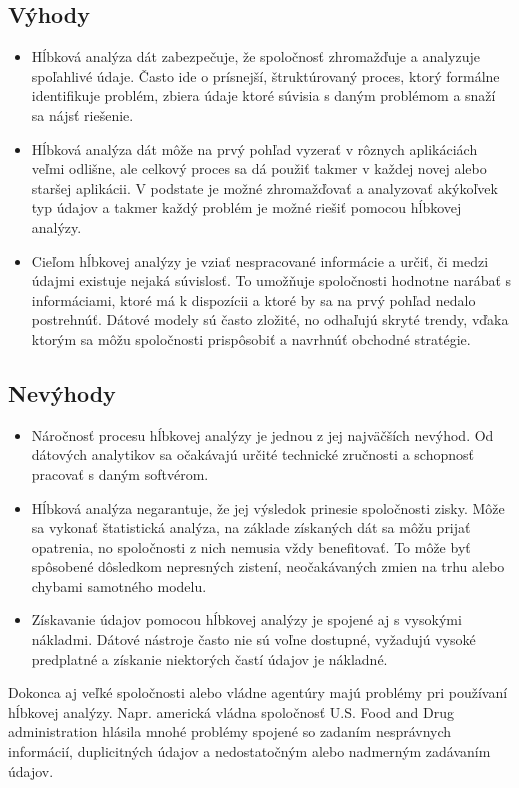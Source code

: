 \documentclass[10pt,twoside,slovak,a4paper]{article}
\begin{document}
\subsection{Výhody}
\begin{itemize}
\item Hĺbková analýza dát zabezpečuje, že spoločnosť zhromažďuje a analyzuje spoľahlivé údaje. Často ide o prísnejší, štruktúrovaný proces, ktorý formálne identifikuje problém, zbiera údaje ktoré súvisia s daným problémom a snaží sa nájsť riešenie.\cite{LunaCamp}
\item Hĺbková analýza dát môže na prvý pohľad vyzerať v rôznych aplikáciách veľmi odlišne, ale celkový proces sa dá použiť takmer v každej novej alebo staršej aplikácii. V podstate je možné zhromažďovať a analyzovať akýkoľvek typ údajov a takmer každý problém je možné riešiť pomocou hĺbkovej analýzy.
\item Cieľom hĺbkovej analýzy je vziať nespracované informácie a určiť, či medzi údajmi existuje nejaká súvislosť. To umožňuje spoločnosti hodnotne narábať s  informáciami, ktoré má k dispozícii a ktoré by sa na prvý pohľad nedalo postrehnúť. Dátové modely sú často zložité, no odhaľujú skryté trendy, vďaka ktorým sa môžu spoločnosti prispôsobiť a navrhnúť obchodné stratégie.\cite{AlexandraTwin}
\end{itemize}
\subsection{Nevýhody}
\begin{itemize}
\item Náročnosť procesu hĺbkovej analýzy je jednou z jej najväčších nevýhod. Od dátových analytikov sa očakávajú určité technické zručnosti a schopnosť pracovať s daným softvérom. 
\item Hĺbková analýza negarantuje, že jej výsledok prinesie spoločnosti zisky. Môže sa vykonať štatistická analýza, na základe získaných dát sa môžu prijať opatrenia, no spoločnosti z nich nemusia vždy benefitovať. To môže byť spôsobené dôsledkom nepresných zistení, neočakávaných zmien na trhu alebo chybami samotného modelu.
\item Získavanie údajov pomocou hĺbkovej analýzy je spojené aj s vysokými nákladmi. Dátové nástroje často nie sú voľne dostupné, vyžadujú vysoké predplatné a získanie niektorých častí údajov je nákladné.\cite{AlexandraTwin}\\
\end{itemize}
Dokonca aj veľké spoločnosti alebo vládne agentúry majú problémy pri používaní hĺbkovej analýzy. Napr. americká vládna spoločnosť U.S. Food and Drug administration hlásila mnohé problémy spojené so zadaním nesprávnych informácií, duplicitných údajov a nedostatočným alebo nadmerným zadávaním údajov. \cite{FDA}
\end{document}
